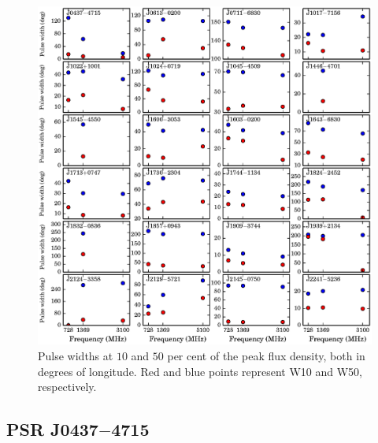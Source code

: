 \documentclass[useAMS,usenatbib]{mn2e}
\begin{document}
\begin{figure}
\begin{center}
\includegraphics[width=6 in]{w50.ps}
\caption{Pulse widths at $10$ and $50$ per cent of the peak flux density, 
both in degrees of longitude. Red and blue points represent W10 and W50, respectively.}
\label{w50}
\end{center}
\end{figure}

\subsection{PSR J0437$-$4715}
\end{document}
